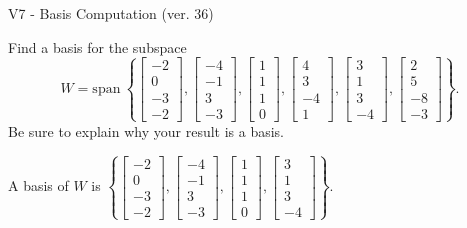 \begin{exercise}
  \begin{exerciseTitle}V7 - Basis Computation (ver. 36)\end{exerciseTitle}
  \begin{exerciseStatement}
    Find a basis for the subspace 
\[W=\mathrm{span}\ \left\{\left[\begin{array}{r}
-2 \\
0 \\
-3 \\
-2
\end{array}\right] , \left[\begin{array}{r}
-4 \\
-1 \\
3 \\
-3
\end{array}\right] , \left[\begin{array}{r}
1 \\
1 \\
1 \\
0
\end{array}\right] , \left[\begin{array}{r}
4 \\
3 \\
-4 \\
1
\end{array}\right] , \left[\begin{array}{r}
3 \\
1 \\
3 \\
-4
\end{array}\right] , \left[\begin{array}{r}
2 \\
5 \\
-8 \\
-3
\end{array}\right]\right\}.\]
 Be sure to explain why your result is a basis.


  \end{exerciseStatement}
  \begin{exerciseAnswer}
   A basis of \(W\) is  \(\left\{\left[\begin{array}{r}
-2 \\
0 \\
-3 \\
-2
\end{array}\right] , \left[\begin{array}{r}
-4 \\
-1 \\
3 \\
-3
\end{array}\right] , \left[\begin{array}{r}
1 \\
1 \\
1 \\
0
\end{array}\right] , \left[\begin{array}{r}
3 \\
1 \\
3 \\
-4
\end{array}\right]\right\}\).
  


  \end{exerciseAnswer}
\end{exercise}